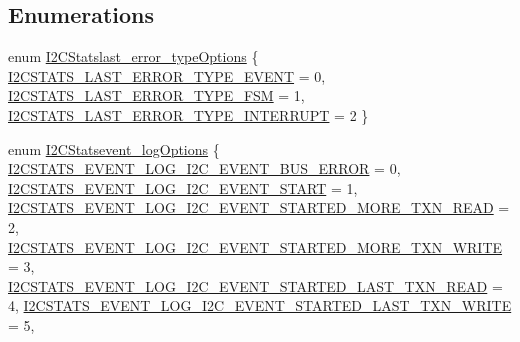 \subsection*{\-Enumerations}
\begin{DoxyCompactItemize}
\item 
enum \hyperlink{group___i2_c_stats_ga896aae85c7be035cc02b11f89e1e5681}{\-I2\-C\-Statslast\-\_\-error\-\_\-type\-Options} \{ \hyperlink{group___i2_c_stats_gga896aae85c7be035cc02b11f89e1e5681af1984c74d484d3692791d2840d53ab64}{\-I2\-C\-S\-T\-A\-T\-S\-\_\-\-L\-A\-S\-T\-\_\-\-E\-R\-R\-O\-R\-\_\-\-T\-Y\-P\-E\-\_\-\-E\-V\-E\-N\-T} = 0, 
\hyperlink{group___i2_c_stats_gga896aae85c7be035cc02b11f89e1e5681a3e5f8789cb4a48163efbdf504f0be365}{\-I2\-C\-S\-T\-A\-T\-S\-\_\-\-L\-A\-S\-T\-\_\-\-E\-R\-R\-O\-R\-\_\-\-T\-Y\-P\-E\-\_\-\-F\-S\-M} = 1, 
\hyperlink{group___i2_c_stats_gga896aae85c7be035cc02b11f89e1e5681aeca025ab4a70aaac3e376f392508dfa2}{\-I2\-C\-S\-T\-A\-T\-S\-\_\-\-L\-A\-S\-T\-\_\-\-E\-R\-R\-O\-R\-\_\-\-T\-Y\-P\-E\-\_\-\-I\-N\-T\-E\-R\-R\-U\-P\-T} = 2
 \}
\item 
enum \hyperlink{group___i2_c_stats_gae803cac254ef7e0b2d08ebcc3578241a}{\-I2\-C\-Statsevent\-\_\-log\-Options} \{ \*
\hyperlink{group___i2_c_stats_ggae803cac254ef7e0b2d08ebcc3578241aad0258c0454ebc58a8e4e601dd85a5936}{\-I2\-C\-S\-T\-A\-T\-S\-\_\-\-E\-V\-E\-N\-T\-\_\-\-L\-O\-G\-\_\-\-I2\-C\-\_\-\-E\-V\-E\-N\-T\-\_\-\-B\-U\-S\-\_\-\-E\-R\-R\-O\-R} = 0, 
\hyperlink{group___i2_c_stats_ggae803cac254ef7e0b2d08ebcc3578241aa8d2addabfedc7af557bc852e095564f5}{\-I2\-C\-S\-T\-A\-T\-S\-\_\-\-E\-V\-E\-N\-T\-\_\-\-L\-O\-G\-\_\-\-I2\-C\-\_\-\-E\-V\-E\-N\-T\-\_\-\-S\-T\-A\-R\-T} = 1, 
\hyperlink{group___i2_c_stats_ggae803cac254ef7e0b2d08ebcc3578241aa3fcc040f62509ed23ad336c192febb2f}{\-I2\-C\-S\-T\-A\-T\-S\-\_\-\-E\-V\-E\-N\-T\-\_\-\-L\-O\-G\-\_\-\-I2\-C\-\_\-\-E\-V\-E\-N\-T\-\_\-\-S\-T\-A\-R\-T\-E\-D\-\_\-\-M\-O\-R\-E\-\_\-\-T\-X\-N\-\_\-\-R\-E\-A\-D} = 2, 
\hyperlink{group___i2_c_stats_ggae803cac254ef7e0b2d08ebcc3578241aac3196a3e01ff4dd33f3145469403d39a}{\-I2\-C\-S\-T\-A\-T\-S\-\_\-\-E\-V\-E\-N\-T\-\_\-\-L\-O\-G\-\_\-\-I2\-C\-\_\-\-E\-V\-E\-N\-T\-\_\-\-S\-T\-A\-R\-T\-E\-D\-\_\-\-M\-O\-R\-E\-\_\-\-T\-X\-N\-\_\-\-W\-R\-I\-T\-E} = 3, 
\*
\hyperlink{group___i2_c_stats_ggae803cac254ef7e0b2d08ebcc3578241aa78a74a8d9d336432fcd48ac1a910d76f}{\-I2\-C\-S\-T\-A\-T\-S\-\_\-\-E\-V\-E\-N\-T\-\_\-\-L\-O\-G\-\_\-\-I2\-C\-\_\-\-E\-V\-E\-N\-T\-\_\-\-S\-T\-A\-R\-T\-E\-D\-\_\-\-L\-A\-S\-T\-\_\-\-T\-X\-N\-\_\-\-R\-E\-A\-D} = 4, 
\hyperlink{group___i2_c_stats_ggae803cac254ef7e0b2d08ebcc3578241aa1f283d53b179b121b357660a881e2591}{\-I2\-C\-S\-T\-A\-T\-S\-\_\-\-E\-V\-E\-N\-T\-\_\-\-L\-O\-G\-\_\-\-I2\-C\-\_\-\-E\-V\-E\-N\-T\-\_\-\-S\-T\-A\-R\-T\-E\-D\-\_\-\-L\-A\-S\-T\-\_\-\-T\-X\-N\-\_\-\-W\-R\-I\-T\-E} = 5, 

\end{DoxyCompactItemize}

